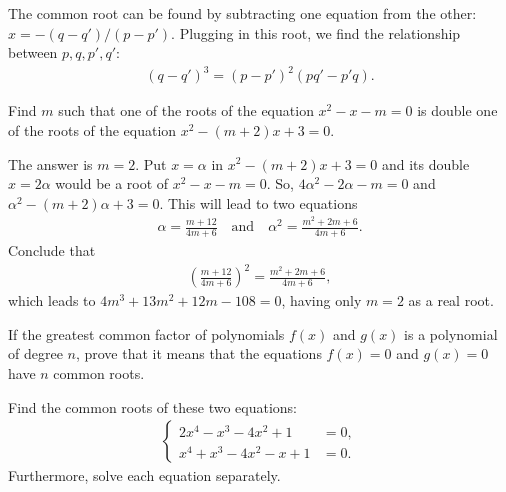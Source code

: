 \begin{solution}
    The common root can be found by subtracting one equation from the other: $x=-(q-q')/(p-p')$. Plugging in this root, we find the relationship between $p,q,p',q'$:
    \begin{align*}
        (q-q')^3 = (p-p')^2 (pq'-p'q).
    \end{align*}
\end{solution}



\begin{question}
    Find $m$ such that one of the roots of the equation $x^2-x-m=0$ is double one of the roots of the equation $x^2-(m+2)x+3=0$.
\end{question}

\begin{solution}
    The answer is $m=2$. Put $x=\alpha$ in $x^2-(m+2)x+3=0$ and its double $x=2\alpha$ would be a root of $x^2-x-m=0$. So, $4\alpha^2-2\alpha-m=0$ and $\alpha^2-(m+2)\alpha+3=0$. This will lead to two equations
    \begin{align*}
        \alpha = \frac{m+12}{4m+6} \quad \text{and} \quad \alpha^2=\frac{m^2+2m+6}{4m+6}.
    \end{align*}
    Conclude that
    \begin{align*}
        \left(\frac{m+12}{4m+6}\right)^2 = \frac{m^2+2m+6}{4m+6},
    \end{align*}
    which leads to $4m^3+13m^2+12m-108=0$, having only $m=2$ as a real root.
\end{solution}

\begin{tcolorbox}
    \begin{question}
        If the greatest common factor of polynomials $f(x)$ and $g(x)$ is a polynomial of degree $n$, prove that it means that the equations $f(x)=0$ and $g(x)=0$ have $n$ common roots.
    \end{question}
\end{tcolorbox}


\begin{question}
    Find the common roots of these two equations:
    \begin{align*}
        \begin{cases}
            2x^4-x^3-4x^2+1&=0,\\x^4+x^3-4x^2-x+1&=0.
        \end{cases}
    \end{align*}
    Furthermore, solve each equation separately. 
\end{question}

